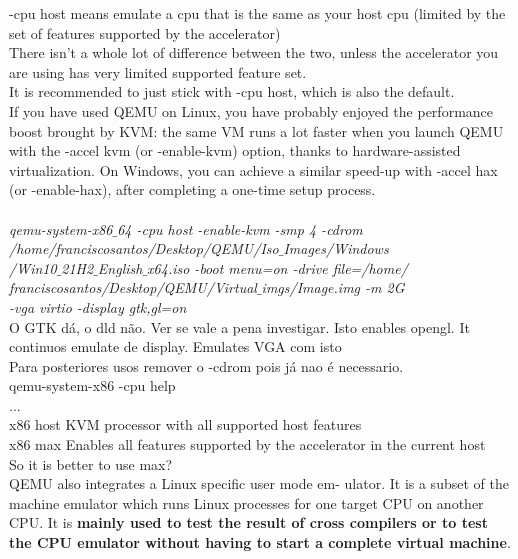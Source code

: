 \documentclass[11pt, a4paper, oneside]{article}
\theoremstyle{definition}
\begin{document}
-cpu host means emulate a cpu that is the same as your host cpu (limited by the set of features supported by the accelerator)\\

There isn't a whole lot of difference between the two, unless the accelerator you are using has very limited supported feature set.\\

It is recommended to just stick with -cpu host, which is also the default.\\
If you have used QEMU on Linux, you have probably enjoyed the performance boost brought by KVM: the same VM runs a lot faster when you launch QEMU with the -accel kvm (or -enable-kvm) option, thanks to hardware-assisted virtualization. On Windows, you can achieve a similar speed-up with -accel hax (or -enable-hax), after completing a one-time setup process.\\
\\
\textit{qemu-system-x86$\_$64 -cpu host -enable-kvm -smp 4 -cdrom \\/home/franciscosantos/Desktop/QEMU/Iso$\_$Images/Windows\\/Win10$\_$21H2$\_$English$\_$x64.iso -boot menu=on -drive file=/home/\\franciscosantos/Desktop/QEMU/Virtual$\_$imgs/Image.img -m 2G\\ -vga virtio -display gtk,gl=on}\\
O GTK dá, o dld não. Ver se vale a pena investigar. Isto enables opengl. It continuos emulate de display.
Emulates VGA com isto\\

Para posteriores usos remover o -cdrom pois já nao é necessario.\\

qemu-system-x86 -cpu help\\
...\\
x86 host KVM processor with all supported host features\\
x86 max Enables all features supported by the accelerator in the current host\\
So it is better to use max?\\
QEMU also integrates a Linux specific user mode em- ulator. It is a subset of the machine emulator which runs Linux processes for one target CPU on another CPU. It is \textbf{mainly used to test the result of cross compilers or to test the CPU emulator without having to start a complete virtual machine}.\\
\end{document}
